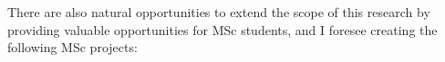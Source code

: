 \documentclass[a4paper,11pt]{article}
\begin{document}





There are also natural opportunities to extend the scope of this research by providing valuable opportunities for MSc students, and I foresee creating the following MSc projects:
\end{document}
